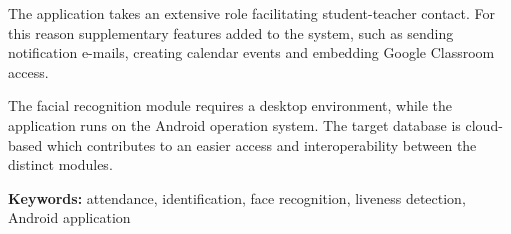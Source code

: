 The application takes an extensive role facilitating student-teacher contact. For this reason supplementary features added to the system, such as sending notification e-mails, creating calendar events and embedding Google Classroom access.

The facial recognition module requires a desktop environment, while the application runs on the Android operation system. The target database is cloud-based which contributes to an easier access and interoperability between the distinct modules.

\vspace*{2cm}

\noindent \textbf{Keywords:} attendance, identification, face recognition, liveness detection, Android application 

\vfill
\dolgozatnyelve
{}